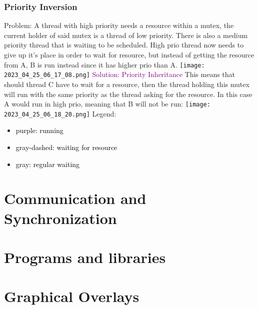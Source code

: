 \documentclass[main.tex,fontsize=8pt,paper=a4,paper=portrait,DIV=calc,]{scrartcl}
\begin{document}
\subsubsection{Priority Inversion}
Problem: A thread with high priority needs a resource within a mutex, the current holder of said mutex is a thread of low priority.\newline
There is also a medium priority thread that is waiting to be scheduled.\newline
High prio thread now needs to give up it's place in order to wait for resource, but instead of getting the resource from A, B is run instead since it has higher prio than A.\newline
\texttt{[image: 2023\_04\_25\_06\_17\_08.png]}\newline
\textcolor{purple}{Solution: Priority Inheritance}\newline
This means that should thread C have to wait for a resource, then the thread holding this mutex will run with the same priority as the thread asking for the resource. \newline
In this case A would run in high prio, meaning that B will not be run:\newline
\texttt{[image: 2023\_04\_25\_06\_18\_20.png]}\newline
Legend:
\begin{itemize}
\item \textcolor{black}{purple: running}
\item \textcolor{black}{gray-dashed: waiting for resource}
\item \textcolor{black}{gray: regular waiting}
\end{itemize} 

\section{Communication and Synchronization}

\section{Programs and libraries}

\section{Graphical Overlays}


\end{document}
